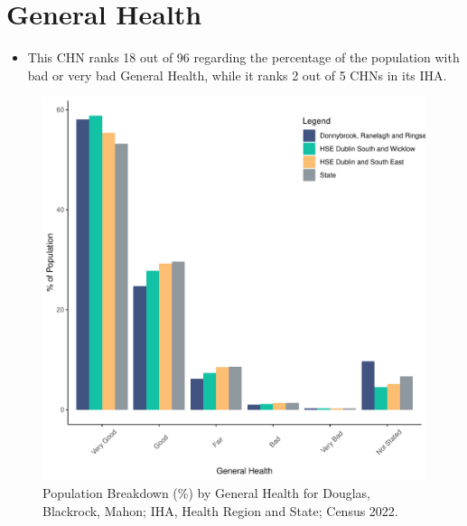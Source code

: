 \documentclass{article}
\begin{document}
\pagebreak

\section{General Health}\label{sect:GenHealth}
\begin{itemize}
\item  This CHN ranks  18 out of 96 regarding the percentage of the population with bad or very bad General Health, while it ranks   2 out of 5 CHNs in its IHA.
\end{itemize}
\begin{figure}[h]
	\centering
	\includegraphics[width = 150mm]{../figures/GenED.pdf}
	\caption{Population Breakdown (\%) by General Health for Douglas, Blackrock, Mahon; IHA, Health Region and State;  Census 2022.}
	\label{fig:2ae19629-1a6a-13a3-e055-000000000001}
	\end{figure}
\end{document}
